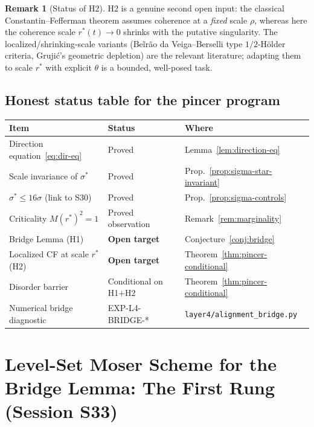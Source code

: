 \documentclass[11pt]{article}
\theoremstyle{definition}
\newtheorem{remark}[theorem]{Remark}
\theoremstyle{remark}
\begin{document}
\begin{remark}[Status of H2]
  H2 is a genuine second open input: the classical Constantin--Fefferman
  theorem \cite{ConstantinFefferman1993} assumes coherence at a
  \emph{fixed} scale $\rho$, whereas here the coherence scale $r^*(t)\to 0$
  shrinks with the putative singularity. The localized/shrinking-scale
  variants (Be\~{i}r\~{a}o da Veiga--Berselli type $1/2$-H\"older criteria,
  Gruji\'c's geometric depletion) are the relevant literature; adapting them
  to scale $r^*$ with explicit $\theta$ is a bounded, well-posed task.
\end{remark}

\subsection{Honest status table for the pincer program}

\begin{center}
\begin{tabular}{lll}
\hline
Item & Status & Where \\
\hline
Direction equation~\eqref{eq:dir-eq} & Proved & Lemma~\ref{lem:direction-eq} \\
Scale invariance of $\sigma^*$ & Proved & Prop.~\ref{prop:sigma-star-invariant} \\
$\sigma^*\leq 16\sigma$ (link to S30) & Proved & Prop.~\ref{prop:sigma-controls} \\
Criticality $M(r^*)^2=1$ & Proved observation & Remark~\ref{rem:marginality} \\
Bridge Lemma (H1) & \textbf{Open target} & Conjecture~\ref{conj:bridge} \\
Localized CF at scale $r^*$ (H2) & \textbf{Open target} & Theorem~\ref{thm:pincer-conditional} \\
Disorder barrier & Conditional on H1+H2 & Theorem~\ref{thm:pincer-conditional} \\
Numerical bridge diagnostic & EXP-L4-BRIDGE-* & \texttt{layer4/alignment\_bridge.py} \\
\hline
\end{tabular}
\end{center}

\section{Level-Set Moser Scheme for the Bridge Lemma: The First Rung (Session S33)}
\label{sec:moser-s33}
\end{document}
